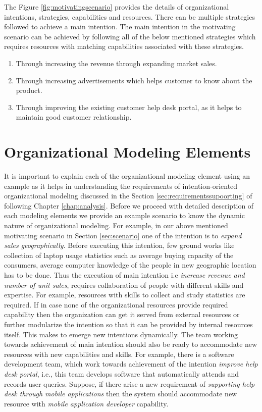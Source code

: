 The Figure \ref{fig:motivatingscenario} provides the details of organizational intentions, strategies, capabilities and resources. There can be multiple strategies followed to achieve a main intention. The main intention in the motivating scenario can be achieved by following all of the below mentioned strategies which requires resources with matching capabilities associated with these strategies. 
 
 \begin{enumerate}
 	\item Through increasing the revenue through expanding market sales. 
 	\item Through increasing advertisements which helps customer to know about the product.
 	\item Through improving the existing customer help desk portal, as it helps to maintain good customer relationship.
 \end{enumerate}
 
\section{Organizational Modeling Elements}
\label{sec:entities}
It is important to explain each of the organizational modeling element using an example as it helps in understanding the requirements of intention-oriented organizational modeling discussed in the Section \ref{sec:requirementssupoorting} of following Chapter \ref{chap:analysis}. Before we proceed with detailed description of each modeling elements we provide an example scenario to know the dynamic nature of organizational modeling. For example, in our above mentioned motivating scenario in Section \ref{sec:scenario} one of the intention is to \textit{expand sales geographically}. Before executing this intention, few ground works like collection of laptop usage statistics such as average buying capacity of the consumers, average computer knowledge of the people in new geographic location has to be done. Thus the execution of main intention i.e \textit{increase revenue and number of unit sales}, requires collaboration of people with different skills and expertise. For example, resources with skills to collect and study statistics are required. If in case none of the organizational resources provide required capability then the organization can get it served from external resources or further modularize the intention so that it can be provided by internal resources itself. This makes to emerge new intentions dynamically. The team working towards achievement of main intention should also be ready to accommodate new resources with new capabilities and skills. For example, there is a software development team, which work towards achievement of the intention \textit{improve help desk portal}, i.e., this team develops software that automatically attends and records user queries. Suppose, if there arise a new requirement of \textit{supporting help desk through mobile applications} then the system should accommodate new resource with \textit{mobile application developer} capability. 

